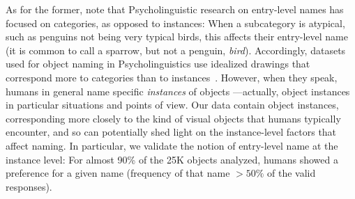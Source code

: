 As for the former, note that Psycholinguistic research on entry-level names has focused on categories, as opposed to instances:
When a subcategory is atypical, such as penguins not being very typical birds, this affects their entry-level name (it is common to call a sparrow, but not a penguin, \textit{bird}).
Accordingly, datasets used for object naming in Psycholinguistics use idealized drawings that correspond more to categories than to instances~\cite{+++++}.
However, when they speak, humans in general name specific \textit{instances} of objects ---actually, object instances in particular situations and points of view.
Our data contain object instances, corresponding more closely to the kind of visual objects that humans typically encounter, and so can potentially shed light on the instance-level factors that affect naming.
In particular, we validate the notion of entry-level name at the instance level:
For almost 90\% of the 25K objects analyzed, humans showed a preference for a given name (frequency of that name $>50\%$ of the valid responses).

